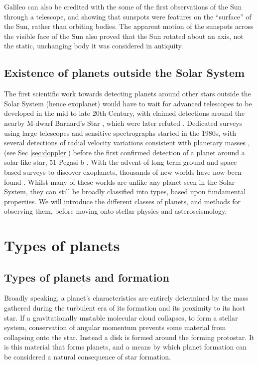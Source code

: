 Galileo can also be credited with the some of the first observations of the Sun through a telescope, and showing that sunspots were features on the ``surface'' of the Sun, rather than orbiting bodies. The apparent motion of the sunspots across the visible face of the Sun also proved that the Sun rotated about an axis, not the static, unchanging body it was considered in antiquity.

\subsection{Existence of planets outside the Solar System}
The first scientific work towards detecting planets around other stars outside the Solar System (hence exoplanet) would have to wait for advanced telescopes to be developed in the mid to late 20th Century, with claimed detections around the nearby M-dwarf Barnard's Star \citep{1963VandK,1969VandK}, which were later refuted \citep{1973Gatewood}. Dedicated surveys using large telescopes and sensitive spectrographs started in the 1980s, with several detections of radial velocity variations consistent with planetary masses \citep{1988Campbell,1989Latham}, (see Sec \ref{sec:doppler}) before the first confirmed detection of a planet around a solar-like star, 51 Pegasi b \citep{51peg}. With the advent of long-term ground and space based surveys to discover exoplanets, thousands of new worlds have now been found \citep{2014Batalha,2014Fischer}. Whilst many of these worlds are unlike any planet seen in the Solar System, they can still be broadly classified into types, based upon fundamental properties. We will introduce the different classes of planets, and methods for observing them, before moving onto stellar physics and asteroseismology.


\section{Types of planets}
\subsection{Types of planets and formation}\label{sec:planetform}
Broadly speaking, a planet's characteristics are entirely determined by the mass gathered during the turbulent era of its formation and its proximity to its host star. If a gravitationally unstable molecular cloud collapses, to form a stellar system, conservation of angular momentum prevents some material from collapsing onto the star. Instead a disk is formed around the forming protostar. It is this material that forms planets, and a means by which planet formation can be considered a natural consequence of star formation.

